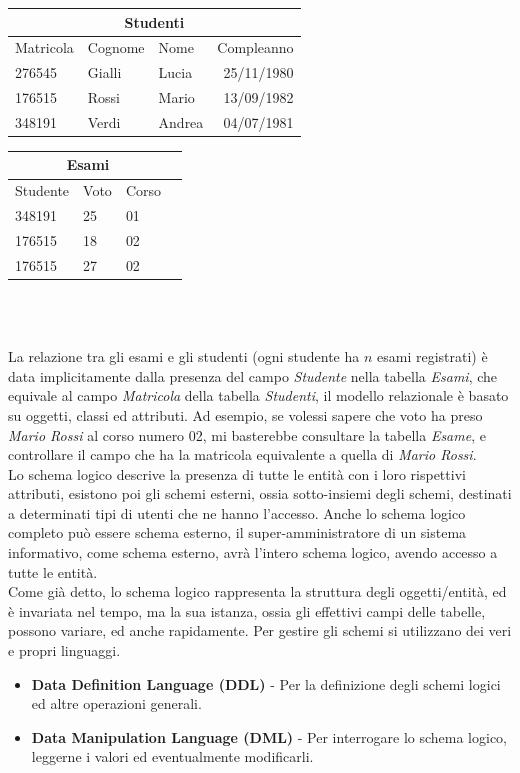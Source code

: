 \documentclass[12pt, letterpaper]{article}
\begin{document}
\centering
\begin{tabular}{|l|l|l|r|}
    \hline
\multicolumn{4}{|c|}{\textbf{Studenti}}\\
    \hline
    Matricola & Cognome & Nome & Compleanno\\
    \hline
    276545 & Gialli & Lucia & 25/11/1980\\
    \hline
    176515 & Rossi & Mario & 13/09/1982\\
    \hline
    348191 & Verdi & Andrea & 04/07/1981\\
    \hline
    \end{tabular}
\begin{tabular}{|l|l|l|r|}
    \hline
\multicolumn{3}{|c|}{\textbf{Esami}}\\
    \hline
    Studente & Voto & Corso \\
    \hline
    348191 & 25 & 01 \\
    \hline
    176515 & 18 & 02 \\
    \hline
    176515 & 27 & 02 \\
    \hline
    \end{tabular}
\\ 
 \hphantom{.}\\
 \raggedright
La relazione tra gli esami e gli studenti (ogni studente ha \(n\) esami registrati) è data implicitamente
dalla presenza del campo \textit{Studente} nella tabella \textit{Esami}, che equivale al campo \textit{Matricola}
della tabella \textit{Studenti}, il modello relazionale è basato su oggetti, classi ed attributi.
Ad esempio, se volessi sapere che voto ha preso \textit{Mario Rossi} al corso numero 02, mi basterebbe
consultare la tabella \textit{Esame}, e controllare il campo che ha la matricola equivalente a quella di \textit{Mario Rossi}.
\\Lo schema logico descrive la presenza di tutte le entità con i loro rispettivi attributi, esistono poi gli schemi
esterni, ossia sotto-insiemi degli schemi, destinati a determinati tipi di utenti che ne hanno l'accesso. Anche lo schema 
logico completo può essere schema esterno, il super-amministratore di un sistema informativo, come schema esterno, avrà 
l'intero schema logico, avendo accesso a tutte le entità.
\\Come già detto, lo schema logico rappresenta la struttura degli oggetti/entità, ed è invariata nel tempo, ma la 
sua istanza, ossia gli effettivi campi delle tabelle, possono variare, ed anche rapidamente. Per gestire gli schemi si utilizzano
dei veri e propri linguaggi.
\begin{itemize}
    \item \textbf{Data Definition Language (DDL)} - Per la definizione degli schemi logici ed altre operazioni generali.
    \item \textbf{Data Manipulation Language (DML)} - Per interrogare lo schema logico, leggerne i valori ed eventualmente modificarli. 
\end{itemize}
\end{document}
